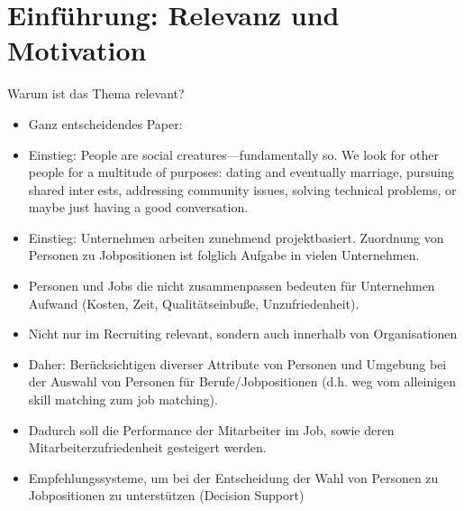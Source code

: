 \newpage

\section{Einführung: Relevanz und Motivation}
\label{ch:notizen:relevanzMotivation}
Warum ist das Thema relevant?
\begin{itemize}
    \item Ganz entscheidendes Paper: %
    \item Einstieg: People are social creatures—fundamentally so. We look for other people for a multitude of purposes: dating and eventually marriage, pursuing shared interests, addressing community issues, solving technical problems, or maybe just having a good conversation.%
    \item Einstieg: Unternehmen arbeiten zunehmend projektbasiert. Zuordnung von Personen zu Jobpositionen ist folglich Aufgabe in vielen Unternehmen.
    \item Personen und Jobs die nicht zusammenpassen bedeuten für Unternehmen Aufwand (Kosten, Zeit, Qualitätseinbuße, Unzufriedenheit).
    \item Nicht nur im Recruiting relevant, sondern auch innerhalb von Organisationen %
    \item Daher: Berücksichtigen diverser Attribute von Personen und Umgebung bei der Auswahl von Personen für Berufe/Jobpositionen (d.h. weg vom alleinigen skill matching zum job matching).
    \item Dadurch soll die Performance der Mitarbeiter im Job, sowie deren Mitarbeiterzufriedenheit gesteigert werden.
    \item Empfehlungssysteme, um bei der Entscheidung der Wahl von Personen zu Jobpositionen zu unterstützen (Decision Support) %
\end{itemize}

